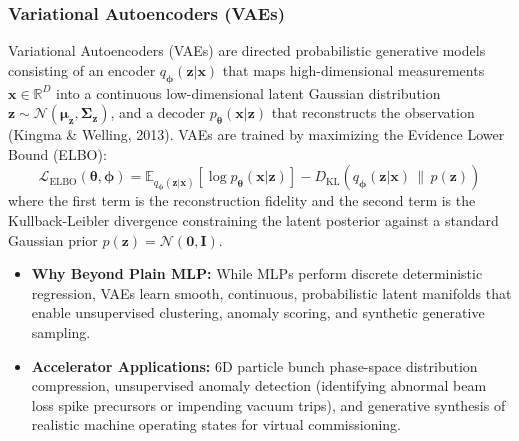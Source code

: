 \documentclass[11pt,a4paper]{article}
\begin{document}
\subsubsection{Variational Autoencoders (VAEs)}
Variational Autoencoders (VAEs) are directed probabilistic generative models consisting of an encoder $q_{\boldsymbol{\phi}}(\mathbf{z}|\mathbf{x})$ that maps high-dimensional measurements $\mathbf{x} \in \mathbb{R}^D$ into a continuous low-dimensional latent Gaussian distribution $\mathbf{z} \sim \mathcal{N}(\boldsymbol{\mu}_{\mathbf{z}}, \boldsymbol{\Sigma}_{\mathbf{z}})$, and a decoder $p_{\boldsymbol{\theta}}(\mathbf{x}|\mathbf{z})$ that reconstructs the observation (Kingma \& Welling, 2013). VAEs are trained by maximizing the Evidence Lower Bound (ELBO):
\begin{equation}
    \mathcal{L}_{\text{ELBO}}(\boldsymbol{\theta}, \boldsymbol{\phi}) = \mathbb{E}_{q_{\boldsymbol{\phi}}(\mathbf{z}|\mathbf{x})}\left[ \log p_{\boldsymbol{\theta}}(\mathbf{x}|\mathbf{z}) \right] - D_{\text{KL}}\left( q_{\boldsymbol{\phi}}(\mathbf{z}|\mathbf{x}) \,\big\|\, p(\mathbf{z}) \right)
\end{equation}
where the first term is the reconstruction fidelity and the second term is the Kullback-Leibler divergence constraining the latent posterior against a standard Gaussian prior $p(\mathbf{z}) = \mathcal{N}(\mathbf{0}, \mathbf{I})$.
\begin{itemize}
    \item \textbf{Why Beyond Plain MLP:} While MLPs perform discrete deterministic regression, VAEs learn smooth, continuous, probabilistic latent manifolds that enable unsupervised clustering, anomaly scoring, and synthetic generative sampling.
    \item \textbf{Accelerator Applications:} 6D particle bunch phase-space distribution compression, unsupervised anomaly detection (identifying abnormal beam loss spike precursors or impending vacuum trips), and generative synthesis of realistic machine operating states for virtual commissioning.
\end{itemize}
\end{document}
